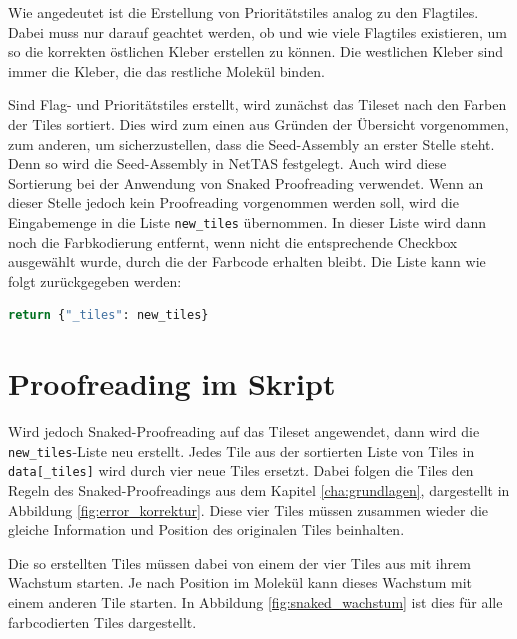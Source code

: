 Wie angedeutet ist die Erstellung von Prioritätstiles analog zu den Flagtiles. Dabei muss nur darauf geachtet werden, ob und wie viele Flagtiles existieren, um so die korrekten östlichen Kleber erstellen zu können. Die westlichen Kleber sind immer die Kleber, die das restliche Molekül binden.

Sind Flag- und Prioritätstiles erstellt, wird zunächst das Tileset nach den Farben der Tiles sortiert. Dies wird zum einen aus Gründen der Übersicht vorgenommen, zum anderen, um sicherzustellen, dass die Seed-Assembly an erster Stelle steht. Denn so wird die Seed-Assembly in NetTAS festgelegt. Auch wird diese Sortierung bei der Anwendung von Snaked Proofreading verwendet. Wenn an dieser Stelle jedoch kein Proofreading vorgenommen werden soll, wird die Eingabemenge in die Liste \texttt{new\_tiles} übernommen. In dieser Liste wird dann noch die Farbkodierung entfernt, wenn nicht die entsprechende Checkbox ausgewählt wurde, durch die der Farbcode erhalten bleibt. Die Liste kann wie folgt zurückgegeben werden:
\begin{lstlisting}[language=python, caption={[Main-Funktion Rückgabe]{Die Rückgabe der Main-Funktion, die so erstellt wird, dass sie ohne Probleme in eine JSON-Ausgabedatei geschrieben werden kann.}}]
    return {"_tiles": new_tiles}
\end{lstlisting}

\section{Proofreading im Skript}

Wird jedoch Snaked-Proofreading auf das Tileset angewendet, dann wird die \texttt{new\_tiles}-Liste neu erstellt. Jedes Tile aus der sortierten Liste von Tiles in \texttt{data[\_tiles]} wird durch vier neue Tiles ersetzt. Dabei folgen die Tiles den Regeln des Snaked-Proofreadings aus dem Kapitel \ref{cha:grundlagen}, dargestellt in Abbildung \ref{fig:error_korrektur}. Diese vier Tiles müssen zusammen wieder die gleiche Information und Position des originalen Tiles beinhalten. 

Die so erstellten Tiles müssen dabei von einem der vier Tiles aus mit ihrem Wachstum starten. Je nach Position im Molekül kann dieses Wachstum mit einem anderen Tile starten. In Abbildung \ref{fig:snaked_wachstum} ist dies für alle farbcodierten Tiles dargestellt. 

